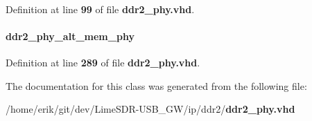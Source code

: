 \paragraph[{ddr2\+\_\+phy\+\_\+alt\+\_\+mem\+\_\+phy}]{ {\bfseries \textcolor{vhdlchar}{ }} \hspace{0.3cm}{\ttfamily [Component]}}\label{classddr2__phy_1_1SYN_aa67e36486b9ba1bdbfecf0c2d295e456}


Definition at line {\bf 99} of file {\bf ddr2\+\_\+phy.\+vhd}.

\paragraph[{ddr2\+\_\+phy\+\_\+alt\+\_\+mem\+\_\+phy\+\_\+inst}]{ {\bfseries \textcolor{vhdlchar}{ddr2\+\_\+phy\+\_\+alt\+\_\+mem\+\_\+phy}\textcolor{vhdlchar}{ }} \hspace{0.3cm}{\ttfamily [Instantiation]}}\label{classddr2__phy_1_1SYN_aa2baae6e39803293ac0993c87ab00796}


Definition at line {\bf 289} of file {\bf ddr2\+\_\+phy.\+vhd}.



The documentation for this class was generated from the following file\+:\begin{DoxyCompactItemize}
\item 
/home/erik/git/dev/\+Lime\+S\+D\+R-\/\+U\+S\+B\+\_\+\+G\+W/ip/ddr2/{\bf ddr2\+\_\+phy.\+vhd}\end{DoxyCompactItemize}
